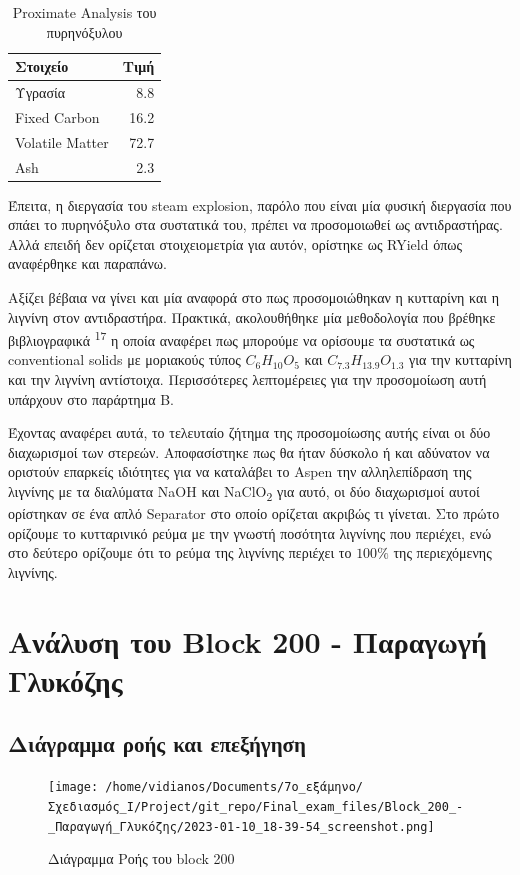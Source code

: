 \documentclass[11pt]{article}
\makeatletter
\newcommand{\citeprocitem}[2]{\hyper@linkstart{cite}{citeproc_bib_item_#1}#2\hyper@linkend}
\makeatother
\begin{document}
\begin{table}[htbp]
\caption{Proximate Analysis του πυρηνόξυλου}
\centering
\begin{tabular}{lr}
Στοιχείο & Τιμή\\
\hline
Υγρασία & 8.8\\
Fixed Carbon & 16.2\\
Volatile Matter & 72.7\\
Ash & 2.3\\
\end{tabular}
\end{table}

Έπειτα, η διεργασία του steam explosion, παρόλο που είναι μία φυσική διεργασία που σπάει το πυρηνόξυλο στα συστατικά του, πρέπει να προσομοιωθεί ως αντιδραστήρας. Αλλά επειδή δεν ορίζεται στοιχειομετρία για αυτόν, ορίστηκε ως RYield όπως αναφέρθηκε και παραπάνω.

Αξίζει βέβαια να γίνει και μία αναφορά στο πως προσομοιώθηκαν η κυτταρίνη και η λιγνίνη στον αντιδραστήρα. Πρακτικά, ακολουθήθηκε μία μεθοδολογία που βρέθηκε βιβλιογραφικά \textsuperscript{\citeprocitem{17}{17}} η οποία αναφέρει πως μπορούμε να ορίσουμε τα συστατικά ως conventional solids με μοριακούς τύπος \(C_6H_{10}O_5\) και \(C_{7.3}H_{13.9}O_{1.3}\) για την κυτταρίνη και την λιγνίνη αντίστοιχα. Περισσότερες λεπτομέρειες για την προσομοίωση αυτή υπάρχουν στο παράρτημα B.

Έχοντας αναφέρει αυτά, το τελευταίο ζήτημα της προσομοίωσης αυτής είναι οι δύο διαχωρισμοί των στερεών. Αποφασίστηκε πως θα ήταν δύσκολο ή και αδύνατον να οριστούν επαρκείς ιδιότητες για να καταλάβει το Aspen την αλληλεπίδραση της λιγνίνης με τα διαλύματα NaOH και NaClO\textsubscript{2} για αυτό, οι δύο διαχωρισμοί αυτοί ορίστηκαν σε ένα απλό Separator στο οποίο ορίζεται ακριβώς τι γίνεται. Στο πρώτο ορίζουμε το κυτταρινικό ρεύμα με την γνωστή ποσότητα λιγνίνης που περιέχει, ενώ στο δεύτερο ορίζουμε ότι το ρεύμα της λιγνίνης περιέχει το \(100 \%\) της περιεχόμενης λιγνίνης.

\section{Ανάλυση του Block 200 - Παραγωγή Γλυκόζης}
\label{sec:org09758ff}

\subsection{Διάγραμμα ροής και επεξήγηση}
\label{sec:orga80de86}
\begin{figure}[htbp]
\centering
\texttt{[image: /home/vidianos/Documents/7o\_εξάμηνο/Σχεδιασμός\_Ι/Project/git\_repo/Final\_exam\_files/Block\_200\_-\_Παραγωγή\_Γλυκόζης/2023-01-10\_18-39-54\_screenshot.png]}
\caption{Διάγραμμα Ροής του block 200}
\end{figure}
\end{document}
